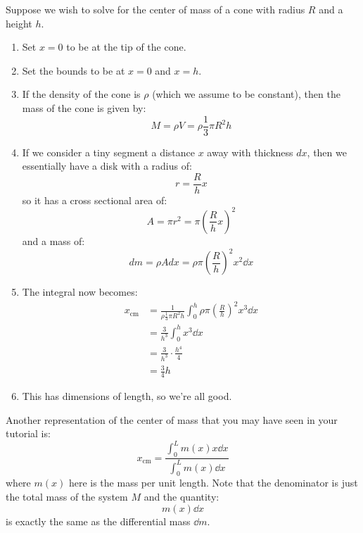 \documentclass{article}
\begin{document}
\begin{example}
    Suppose we wish to solve for the center of mass of a cone with radius $R$ and a height $h$.
    \begin{enumerate}
        \item Set $x=0$ to be at the tip of the cone.
        \item Set the bounds to be at $x=0$ and $x=h$.
        \item If the density of the cone is $\rho$ (which we assume to be constant), then the mass of the cone is given by:
        \begin{equation}
            M = \rho V = \rho \frac{1}{3}\pi R^2 h
            \label{eq:}
        \end{equation}
        \item If we consider a tiny segment a distance $x$ away with thickness $dx$, then we essentially have a disk with a radius of:
        \begin{equation}
            r = \frac{R}{h}x
            \label{eq:}
        \end{equation}
        so it has a cross sectional area of:
        \begin{equation}
            A = \pi r^2 = \pi \left(\frac{R}{h}x\right)^2
            \label{eq:}
        \end{equation}
        and a mass of:
        \begin{equation}
            dm = \rho A dx = \rho \pi \left(\frac{R}{h}\right)^2 x^2 \dd{x}
            \label{eq:}
        \end{equation}
        \item The integral now becomes:
        \begin{align}
            x_\text{cm}&=\frac{1}{\rho \frac{1}{3}\pi R^2 h} \int_0^h \rho \pi \left(\frac{R}{h}\right)^2 x^3 \dd{x} \\ 
            &= \frac{3}{h^3} \int_0^h  x^3 \dd{x} \\ 
            &= \frac{3}{h^3} \cdot \frac{h^4}{4} \\ 
            &= \frac{3}{4}h
            \label{eq:}
        \end{align}
        \item This has dimensions of length, so we're all good.
    \end{enumerate}
\end{example}
Another representation of the center of mass that you may have seen in your tutorial is:
\begin{equation}
    x_\text{cm} = \frac{\displaystyle \int_0^L m(x)x \dd{x}}{\displaystyle\int_0^L m(x) \dd{x}}
    \label{eq:}
\end{equation}
where $m(x)$ here is the mass per unit length. Note that the denominator is just the total mass of the system $M$ and the quantity:
\begin{equation}
    m(x)\dd{x}
    \label{eq:}
\end{equation}
is exactly the same as the differential mass $\dd{m}$.
\end{document}
